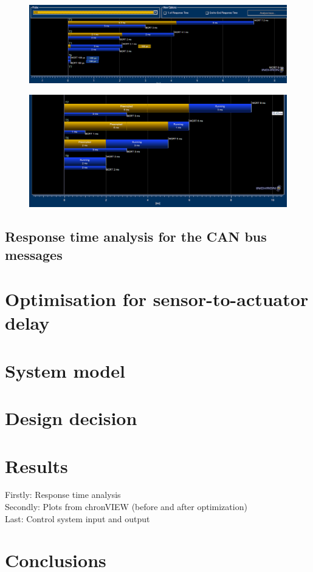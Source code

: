 \begin{figure}[h]
	\begin{center}
		\includegraphics[width=0.7\linewidth]{img/pu1-response-time}
		\caption{}
		\label{fig:pu1rt}
	\end{center}
\end{figure}

\begin{figure}[h]
	\begin{center}
		\includegraphics[width=0.7\linewidth]{img/pu2-response-time}
		\caption{}
		\label{fig:pu2rt}
	\end{center}
\end{figure}


\subsection{ Response time analysis for the CAN bus messages}

\section{Optimisation for sensor-to-actuator delay}

\section{System model}

\section{Design decision}

\section{Results}

Firstly: Response time analysis\\
Secondly: Plots from chronVIEW (before and after optimization)\\
Last: Control system input and output

\section{Conclusions}